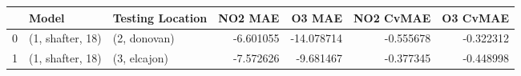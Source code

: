 \begin{tabular}{lllrrrr}
\toprule
{} &             Model & Testing Location &   NO2 MAE &     O3 MAE &  NO2 CvMAE &  O3 CvMAE \\
\midrule
0 &  (1, shafter, 18) &     (2, donovan) & -6.601055 & -14.078714 &  -0.555678 & -0.322312 \\
1 &  (1, shafter, 18) &     (3, elcajon) & -7.572626 &  -9.681467 &  -0.377345 & -0.448998 \\
\bottomrule
\end{tabular}
